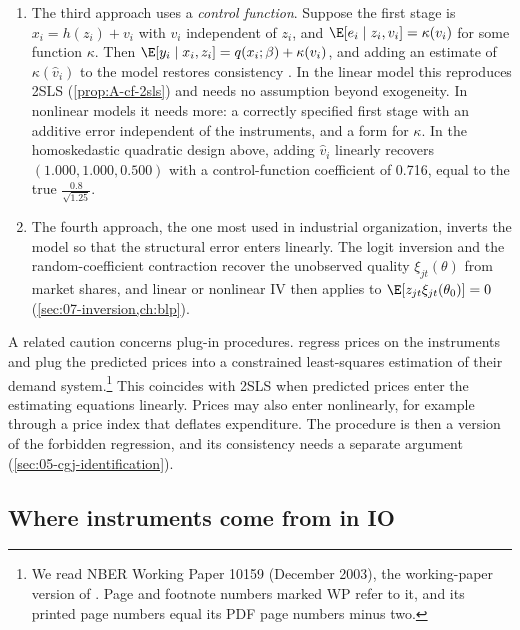 \begin{enumerate}[label=(\roman*)]
  order is rare in demand estimation and deserves scrutiny before use (\cref{sec:10-hausman-ces}).
   develops the general theory.
\item The third approach uses a \emph{control function}. Suppose the first stage is $x_i = h(z_i) + v_i$ with $v_i$ independent of $z_i$,
  and $\E[e_i \mid z_i, v_i] = \kappa(v_i)$ for some function $\kappa$. Then
  $\E[y_i \mid x_i, z_i] = q(x_i; \beta) + \kappa(v_i)$, and adding an estimate of $\kappa(\hat v_i)$ to the model
  restores consistency \citep{RiversVuong1988,PetrinTrain2010}. In the linear model this reproduces 2SLS
  (\cref{prop:A-cf-2sls}) and needs no assumption beyond exogeneity. In nonlinear models it needs more: a
  correctly specified first stage with an additive error independent of the instruments, and a form for
  $\kappa$. In the homoskedastic quadratic design above, adding $\hat v_i$ linearly recovers $(1.000, 1.000, 0.500)$
  with a control-function coefficient of 0.716, equal to the true $\frac{0.8}{\sqrt{1.25}}$.
\item The fourth approach, the one most used in industrial organization, inverts the model so that the
  structural error enters linearly. The logit inversion \citep{Berry1994} and the random-coefficient
  contraction recover the unobserved quality $\xi_{jt}(\theta)$ from market shares, and linear or nonlinear IV
  then applies to $\E[z_{jt}\xi_{jt}(\theta_0)] = 0$ (\cref{sec:07-inversion,ch:blp}).
\end{enumerate}

A related caution concerns plug-in procedures. \citet[WP p.~20]{ChaudhuriGoldbergJia2006} regress prices on the
instruments and plug the predicted prices into a constrained least-squares estimation of their demand
system.\footnote{We read NBER Working Paper 10159 (December 2003), the working-paper version of
\citet{ChaudhuriGoldbergJia2006}. Page and footnote numbers marked WP refer to it, and its printed page numbers
equal its PDF page numbers minus two.}
This coincides with 2SLS when predicted prices enter the estimating equations linearly. Prices may also enter
nonlinearly, for example through a price index that deflates expenditure. The procedure is then a version of
the forbidden regression, and its consistency needs a separate argument (\cref{sec:05-cgj-identification}).

\subsection{Where instruments come from in IO}\label{sec:A-ivsources}

